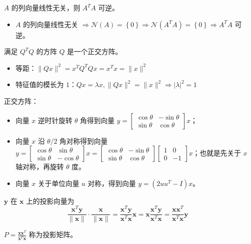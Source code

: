 \begin{remark}
	$A$ 的列向量线性无关，则 $A^TA$ 可逆。
	\begin{itemize}
		\item $A$ 的列向量线性无关 $\Rightarrow \mathcal{N}(A) = \left\{0\right\}\Rightarrow \mathcal{N}(A^TA) = \left\{0\right\}\Rightarrow A^TA$ 可逆。
	\end{itemize}
\end{remark}

\begin{remark}
    满足 $Q^TQ$ 的方阵 $Q$ 是一个正交方阵。
    \begin{itemize}
        \item 等距：$\|Qx\|^2 = x^TQ^TQx = x^Tx = \|x\|^2$
        \item 特征值的模长为 $1$：$Qx = \lambda x, \|Qx\|^2 = \|x\|^2\Rightarrow |\lambda|^2 = 1$
    \end{itemize}
\end{remark}

\begin{remark}
    正交方阵：
    \begin{itemize}
        \item 向量 $x$ 逆时针旋转 $\theta$ 角得到向量 $y = \begin{bmatrix}
            \cos\theta & -\sin\theta \\ 
            \sin\theta & \cos\theta
        \end{bmatrix}x$；
        \item 向量 $x$ 沿 $\theta/2$ 角对称得到向量 $y = \begin{bmatrix}
            \cos\theta & \sin\theta \\ 
            \sin\theta & -\cos\theta
        \end{bmatrix}x = \begin{bmatrix}
            \cos\theta & -\sin\theta \\ 
            \sin\theta & \cos\theta
        \end{bmatrix}\begin{bmatrix}
            1 & 0 \\
            0 & -1
        \end{bmatrix}x$；也就是先关于 $x$ 轴对称，再旋转 $\theta$ 度。
        \item 向量 $x$ 关于单位向量 $u$ 对称，得到向量 $y = (2uu^T-I)x$。
    \end{itemize}
\end{remark}

\begin{remark}
    $\boldsymbol{y}$ 在 $\boldsymbol{x}$ 上的投影向量为 \[\frac{\boldsymbol{x}^{T} \boldsymbol{y}}{\|\boldsymbol{x}\|} \cdot \frac{\boldsymbol{x}}{\|\boldsymbol{x}\|}=\frac{\boldsymbol{x}^{T} \boldsymbol{y}}{\boldsymbol{x}^{T} \boldsymbol{x}} \boldsymbol{x}=\boldsymbol{x} \frac{\boldsymbol{x}^{T} \boldsymbol{y}}{\boldsymbol{x}^{T} \boldsymbol{x}}=\frac{\boldsymbol{x} \boldsymbol{x}^{T}}{\boldsymbol{x}^{T} \boldsymbol{x}} \boldsymbol{y}\]
    
    $P = \frac{\boldsymbol{x} \boldsymbol{x}^{T}}{\boldsymbol{x}^{T} \boldsymbol{x}}$ 称为投影矩阵。
\end{remark}

